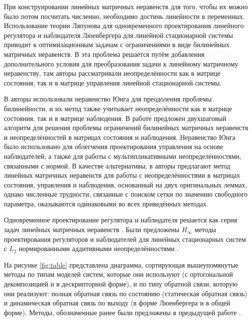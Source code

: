 При конструировании линейных матричных неравенств для того, чтобы их можно было потом посчитать численно, необходимо достичь линейности в переменных. Использование теории Ляпунова для одновременного проектирования линейного регулятора и наблюдателя Люенбергера для линейной стационарной системы приводит к оптимизационным задачам с ограничениями в виде билинейных матричных неравенств. В \cite{LIEN2004} эта проблема решается путём добавления дополнительного условия для преобразования задачи к линейному матричному неравенству, там авторы рассматривали неопределённости как в матрице состояния, так и в матрице управления линейной стационарной системы. 

В \cite{KHELOUFI2013} авторы использовали неравенство Юнга для преодоления проблемы билинейности, и их метод также учитывает неопределённости как в матрице состояния, так и в матрице наблюдения. В работе \cite{ZEMOUCHE2015} предложен двухшаговый алгоритм для решения проблемы ограничений билинейных матричных неравенств и неопределённостей в матрицах состояния и наблюдения. Неравенство Юнга было использовано для облегчения проектирования управления на основе наблюдателей, а также для работы с мультипликативными неопределённостями, связанными с нормой. В качестве альтернативы, в \cite{GRITLI2021} авторы предлагают метод линейных матричных неравенств для работы с неопределённостями в матрицах состояния, управления и наблюдения, основанный на двух оригинальных леммах, однако численные трудности, связанные с поиском сетки по значению свободного параметра, оказываются одинаковыми во всех приведённых методах.

Одновременное проектирование регулятора и наблюдателя решается как серия задач линейных матричных неравенств \cite{ZEMOUCHE2015,GRITLI2021}. Были предложены $H_\infty$ методы проектирования регуляторов и наблюдателей для линейных стационарных систем с $L_2$ нормированными аддитивными неопределённостями \cite{Bennani2019, KHELOUFI2016}.

На рисунке \ref{fig:table} представлена диаграмма, сортирующая вышеупомянутые методы по типам моделей систем, которые они используют (с ортогональной декомпозицией и в дескрипторной форме), и по типу обратной связи, которую они реализуют: полная обратная связь по состоянию (статическая обратная связь) и динамическая обратная связь по выходу (в форме Люенбергера и в общей форме). Методы, обозначенные ранее были предложены в предыдущей работе \cite{Mastersthesis}.

